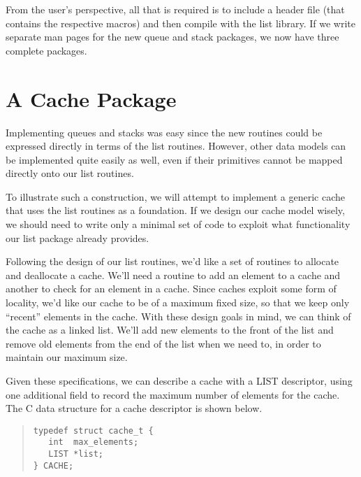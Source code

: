 \documentclass[fullpage,11pt]{article}
\begin{document}
From the user's perspective, all that is required is to include a header file
(that contains the respective macros) and then compile with the list library.
If we write separate man pages for the new queue and stack packages, we
now have three complete packages.


\section{A Cache Package}
Implementing queues and stacks was easy since the new routines could be
expressed directly in terms of the list routines.  However, other data models
can be implemented quite easily as well, even if their primitives cannot be
mapped directly onto our list routines.

To illustrate such a construction, we will attempt to implement a generic
cache that uses the list routines as a foundation.  If we design our cache
model wisely, we should need to write only a minimal set of code to exploit
what functionality our list package already provides.

Following the design of our list routines, we'd like a set of routines to
allocate and deallocate a cache.  We'll need a routine to add an element to a
cache and another to check for an element in a cache.  Since caches exploit
some form of locality, we'd like our cache to be of a maximum fixed size, so
that we keep only ``recent'' elements in the cache.  With these design goals
in mind, we can think of the cache as a linked list.  We'll add new elements
to the front of the list and remove old elements from the end of the list when
we need to, in order to maintain our maximum size.

Given these specifications, we can describe a cache with a LIST descriptor,
using one additional field to record the maximum number of
elements for the cache.  The C data structure for a cache descriptor is
shown below.
\begin{quote}
\begin{verbatim}       
typedef struct cache_t {
   int  max_elements;
   LIST *list;
} CACHE;
\end{verbatim}
\end{quote}
\end{document}
